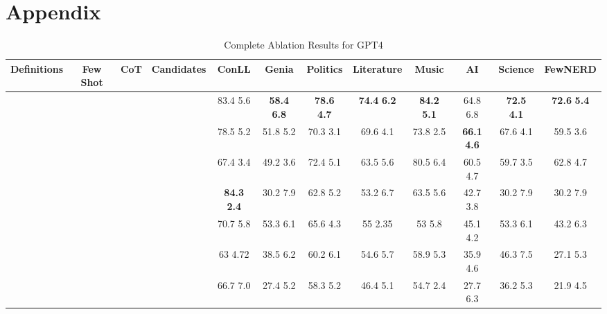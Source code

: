 \documentclass[11pt]{article}
\newcommand{\cmark}{\ding{51}}\newcommand{\xmark}{\ding{55}}\newcommand{\toolname}{PromptNER }
\begin{document}
\section{Appendix}
\label{sec:appendix}
\begin{landscape}
\begin{table}[]
\begin{tabular}{cccccccccccc}
\hline
Definitions & Few Shot & CoT   & Candidates & ConLL                  & Genia            & Politics               & Literature            & Music                    & AI                    & Science & FewNERD                \\\hline
\cmark        & \cmark     & \cmark  & \cmark       & 83.4  5.6          & \textbf{58.4 }  \textbf{ 6.8} & \textbf{78.6 }  \textbf{ 4.7} & \textbf{74.4 }  \textbf{ 6.2} & \textbf{84.2 }  \textbf{ 5.1} & 64.8  6.8          & \textbf{72.5 }  \textbf{ 4.1} & \textbf{72.6 }  \textbf{ 5.4} \\
\cmark        & \cmark     & \cmark  & \xmark      & 78.5  5.2          & 51.8  5.2          & 70.3  3.1          & 69.6  4.1          & 73.8  2.5          & \textbf{66.1 }  \textbf{ 4.6} & 67.6  4.1          & 59.5  3.6          \\
\cmark        & \cmark     & \xmark & \cmark       & 67.4  3.4          & 49.2  3.6          & 72.4  5.1          & 63.5  5.6          & 80.5  6.4          & 60.5  4.7          & 59.7  3.5          & 62.8  4.7          \\
\cmark        & \xmark    & \cmark  & \cmark       & \textbf{84.3  2.4} & 30.2  7.9          & 62.8  5.2          & 53.2  6.7          & 63.5  5.6          & 42.7  3.8          & 30.2  7.9          & 30.2  7.9          \\
\xmark       & \cmark     & \cmark  & \cmark       & 70.7  5.8          & 53.3  6.1          & 65.6  4.3          & 55  2.35           & 53  5.8            & 45.1  4.2          & 53.3  6.1          & 43.2  6.3          \\
\xmark       & \cmark     & \cmark  & \xmark      & 63  4.72           & 38.5  6.2          & 60.2  6.1          & 54.6  5.7          & 58.9  5.3          & 35.9  4.6          & 46.3  7.5          & 27.1  5.3          \\
\xmark       & \cmark     & \xmark & \xmark      & 66.7  7.0          & 27.4  5.2          & 58.3  5.2          & 46.4  5.1          & 54.7  2.4          & 27.7  6.3          & 36.2  5.3          & 21.9  4.5          \\\hline
\end{tabular}
\caption{Complete Ablation Results for GPT4}
\label{table:full_ablation}
\end{table}
\end{landscape}
\end{document}
